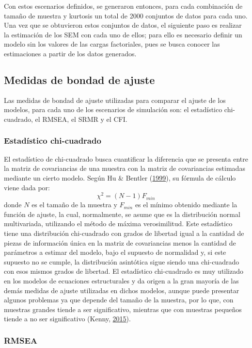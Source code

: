 \documentclass[
  english]{revcoles}
\begin{document}
Con estos escenarios definidos, se generaron entonces, para cada
combinación de tamaño de muestra y kurtosis un total de 2000 conjuntos
de datos para cada uno. Una vez que se obtuvieron estos conjuntos de
datos, el siguiente paso es realizar la estimación de los SEM con cada
uno de ellos; para ello es necesario definir un modelo sin los valores
de las cargas factoriales, pues se busca conocer las estimaciones a
partir de los datos generados.

\subsection{Medidas de bondad de ajuste}

Las medidas de bondad de ajuste utilizadas para comparar el ajuste de
los modelos, para cada uno de los escenarios de simulación son: el
estadístico chi-cuadrado, el RMSEA, el SRMR y el CFI.

\subsubsection{Estadístico chi-cuadrado}

El estadístico de chi-cuadrado busca cuantificar la diferencia que se
presenta entre la matriz de covariancias de una muestra con la matriz de
covariancias estimadas mediante un cierto modelo. Según Hu \& Bentler
(\protect\hyperlink{ref-Hu1999}{1999}), su fórmula de cálculo viene dada
por: \[
  \chi^2 = (N-1) F_{min}
\] donde \(N\) es el tamaño de la muestra y \(F_{min}\) es el mínimo
obtenido mediante la función de ajuste, la cual, normalmente, se asume
que es la distribución normal multivariada, utilizando el método de
máxima verosimilitud. Este estadístico tiene una distribución
chi-cuadrado con grados de libertad igual a la cantidad de piezas de
información única en la matriz de covariancias menos la cantidad de
parámetros a estimar del modelo, bajo el supuesto de normalidad y, si
este supuesto no se cumple, la distribución asintótica sigue siendo una
chi-cuadrado con esos mismos grados de libertad. El estadístico
chi-cuadrado es muy utilizado en los modelos de ecuaciones estructurales
y da origen a la gran mayoría de las demás medidas de ajuste utilizadas
en dichos modelos, aunque puede presentar algunos problemas ya que
depende del tamaño de la muestra, por lo que, con muestras grandes
tiende a ser significativo, mientras que con muestras pequeños tiende a
no ser significativo (Kenny, \protect\hyperlink{ref-Kenny2015}{2015}).

\subsubsection{RMSEA}
\end{document}
